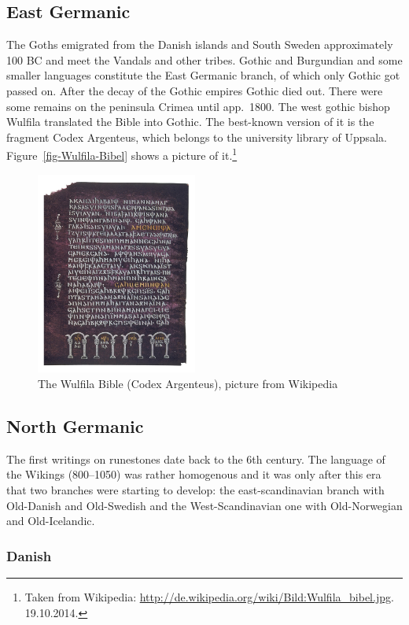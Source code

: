 \subsection{East Germanic}

The Goths emigrated from the Danish islands and South Sweden approximately 100 BC and meet the
Vandals and other tribes.  Gothic and Burgundian and some smaller languages constitute the East Germanic branch, of which only Gothic got passed on.
After the decay of the Gothic empires Gothic died out. There were some remains on the peninsula
Crimea until app.\ 1800. The west gothic bishop Wulfila translated the Bible into Gothic. The
best-known version of it is the fragment Codex Argenteus, which belongs to the university library of
Uppsala. Figure~\vref{fig-Wulfila-Bibel} shows a picture of it.\footnote{
Taken from Wikipedia: \url{http://de.wikipedia.org/wiki/Bild:Wulfila_bibel.jpg}. 19.10.2014.
}
\begin{figure}
\includegraphics[width=53mm]{Pictures/Wulfila_bibel}
\caption{\label{fig-Wulfila-Bibel}The Wulfila Bible (Codex Argenteus), picture from Wikipedia}
\end{figure}



\subsection{North Germanic}

The first writings on runestones date back to the 6th century. The language of the Wikings
(800--1050) was rather homogenous and it was only after this era that two branches were starting to
develop: the east-scandinavian branch with Old-Danish and Old-Swedish and the West-Scandinavian one
with Old-Norwegian and Old-Icelandic.


\subsubsection{Danish}

